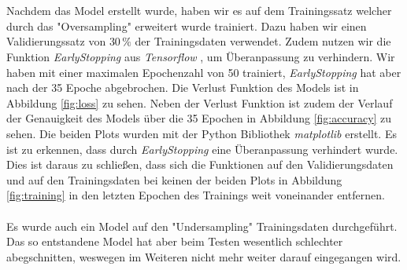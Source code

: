 \\\\
Nachdem das Model erstellt wurde, haben wir es auf dem Trainingssatz welcher durch das "Oversampling" erweitert wurde trainiert.
Dazu haben wir einen Validierungssatz von $30\, \%$ der Trainingsdaten verwendet.
Zudem nutzen wir die Funktion \textit{EarlyStopping} aus \textit{Tensorflow} \cite{tensorflow2015-whitepaper}, um Überanpassung zu verhindern.
Wir haben mit einer maximalen Epochenzahl von 50 trainiert, \textit{EarlyStopping} hat aber nach der 35 Epoche abgebrochen.
Die Verlust Funktion des Models ist in Abbildung \ref{fig:loss} zu sehen.
Neben der Verlust Funktion ist zudem der Verlauf der Genauigkeit des Models über die 35 Epochen in Abbildung \ref{fig:accuracy} zu sehen.
Die beiden Plots wurden mit der Python Bibliothek \textit{matplotlib} \cite{matplotlib} erstellt.
Es ist zu erkennen, dass durch \textit{EarlyStopping} eine Überanpassung verhindert wurde.
Dies ist daraus zu schließen, dass sich die Funktionen auf den Validierungsdaten und auf den Trainingsdaten bei keinen der beiden Plots in Abbildung \ref{fig:training} in den letzten Epochen des Trainings weit voneinander entfernen.
\\\\
Es wurde auch ein Model auf den "Undersampling" Trainingsdaten durchgeführt.
Das so entstandene Model hat aber beim Testen wesentlich schlechter abegschnitten, weswegen im Weiteren nicht mehr weiter darauf eingegangen wird.

